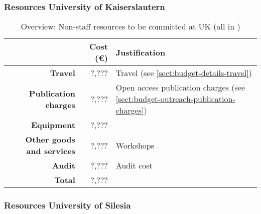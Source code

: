 \subsubsection{Resources University of Kaiserslautern}


\bigskip
\begin{table}[H]
\begin{tabular}{|r|r|p{9cm}|}
\hline
\textbf{} & \textbf{Cost (\euro)} & \textbf{Justification} \\\hline
\textbf{Travel} & ?,??? & Travel (see \ref{sect:budget-details-travel})\\\hline
\textbf{Publication charges} & ?,??? & Open access publication charges (see \ref{sect:budget-outreach-publication-charges})\\\hline
\textbf{Equipment} & ?,??? &  \\\hline    %

\textbf{Other goods and services} & ?,??? & Workshops \\\hline   %
\textbf{Audit} & ?,??? & Audit cost \\\hline
\textbf{Total} & ?,???\\\cline{1-2}
\end{tabular}
\caption{Overview: Non-staff resources to be committed at UK (all in \texteuro)}\vspace*{-1em}
\end{table}




\subsubsection{Resources University of Silesia}


